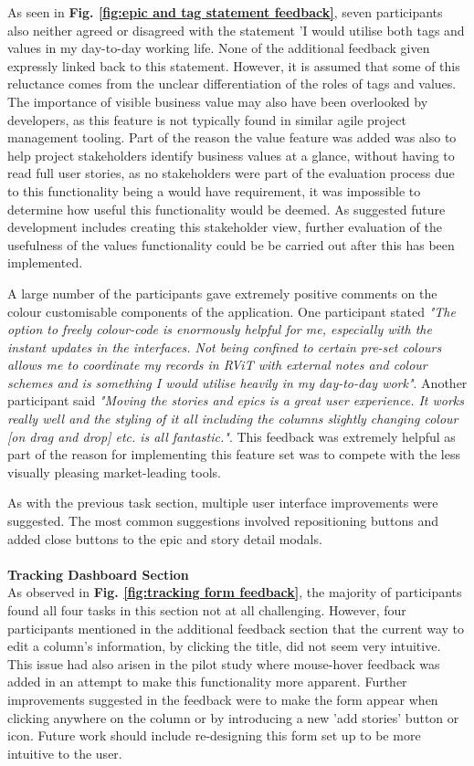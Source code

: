 \documentclass[l4proj.tex]{subfiles}
\begin{document}
As seen in \textbf{Fig. \ref{fig:epic and tag statement feedback}}, seven participants also neither agreed or disagreed with the statement 'I would utilise both tags and values in my day-to-day working life. None of the additional feedback given expressly linked back to this statement. However, it is assumed that some of this reluctance comes from the unclear differentiation of the roles of tags and values. The importance of visible business value may also have been overlooked by developers, as this feature is not typically found in similar agile project management tooling. Part of the reason the value feature was added was also to help project stakeholders identify business values at a glance, without having to read full user stories, as no stakeholders were part of the evaluation process due to this functionality being a would have requirement, it was impossible to determine how useful this functionality would be deemed. As suggested future development includes creating this stakeholder view, further evaluation of the usefulness of the values functionality could be be carried out after this has been implemented.

A large number of the participants gave extremely positive comments on the colour customisable components of the application. One participant stated \textit{"The option to freely colour-code is enormously helpful for me, especially with the instant updates in the interfaces. Not being confined to certain pre-set colours allows me to coordinate my records in RViT with external notes and colour schemes and is something I would utilise heavily in my day-to-day work"}. Another participant said \textit{"Moving the stories and epics is a great user experience. It works really well and the styling of it all including the columns slightly changing colour [on drag and drop] etc. is all fantastic."}. This feedback was extremely helpful as part of the reason for implementing this feature set was to compete with the less visually pleasing market-leading tools.

As with the previous task section, multiple user interface improvements were suggested. The most common suggestions involved repositioning buttons and added close buttons to the epic and story detail modals. \\
\\
\textbf{Tracking Dashboard Section}\\
As observed in \textbf{Fig. \ref{fig:tracking form feedback}}, the majority of participants found all four tasks in this section not at all challenging. However, four participants mentioned in the additional feedback section that the current way to edit a column's information, by clicking the title, did not seem very intuitive. This issue had also arisen in the pilot study where mouse-hover feedback was added in an attempt to make this functionality more apparent. Further improvements suggested in the feedback were to make the form appear when clicking anywhere on the column or by introducing a new 'add stories' button or icon. Future work should include re-designing this form set up to be more intuitive to the user.
\end{document}
